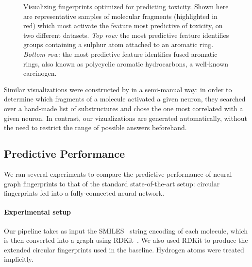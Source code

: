 \documentclass{article}
\newcommand{\citep}{\cite}
\newcommand{\citet}{\cite}
\begin{document}
\begin{figure}[h]
\begin{tabular}{>{\centering}m{1in} >{\centering}m{3.1cm} >{\centering}m{3.3cm} >{\centering\arraybackslash}m{3.1cm}}
\end{tabular}
\vspace{-3mm}
\caption{Visualizing fingerprints optimized for predicting toxicity.
Shown here are representative samples of molecular fragments (highlighted in red) which most activate the feature most predictive of toxicity, on two different datasets.
\emph{Top row:} the most predictive feature identifies groups containing a sulphur atom attached to an aromatic ring.
\emph{Bottom row:} the most predictive feature identifies fused aromatic rings, also known as polycyclic aromatic hydrocarbons, a well-known carcinogen.
}
\label{fig:learned features toxicity}
\end{figure}

Similar visualizations were constructed by \citet{unterthiner2015toxicity} in a semi-manual way: in order to determine which fragments of a molecule activated a given neuron, they searched over a hand-made list of substructures and chose the one most correlated with a given neuron.
In contrast, our vizualizations are generated automatically, without the need to restrict the range of possible answers beforehand.

\subsection{Predictive Performance}

We ran several experiments to compare the predictive performance of neural graph fingerprints to that of the standard state-of-the-art setup: circular fingerprints fed into a fully-connected neural network.

\paragraph{Experimental setup}
Our pipeline takes as input the SMILES~\citep{weininger1988smiles} string encoding of each molecule, which is then converted into a graph using RDKit~\citep{rdkit}.
We also used RDKit to produce the extended circular fingerprints used in the baseline.
Hydrogen atoms were treated implicitly.
\end{document}
